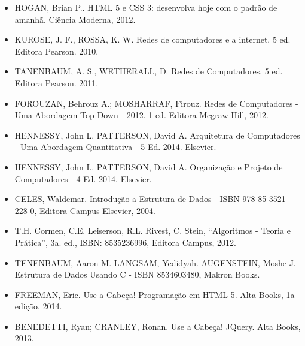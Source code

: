 \begin{itemize}
    \item HOGAN, Brian P..
          HTML 5 e CSS 3: desenvolva hoje com o padrão de amanhã.
          Ciência Moderna, 2012.
	\item KUROSE, J. F., ROSSA, K. W. Redes de computadores e a internet. 5 ed. Editora Pearson. 2010.
	\item TANENBAUM, A. S., WETHERALL, D. Redes de Computadores. 5 ed. Editora Pearson. 2011. 
	\item FOROUZAN, Behrouz A.; MOSHARRAF, Firouz. Redes de Computadores - Uma Abordagem Top-Down - 2012. 1 ed. Editora Mcgraw Hill, 2012.
	\item HENNESSY, John L. PATTERSON, David A. Arquitetura de Computadores - Uma Abordagem Quantitativa - 5 Ed. 2014. Elsevier.
	\item HENNESSY, John L. PATTERSON, David A. Organização e Projeto de Computadores - 4 Ed. 2014. Elsevier.
	\item CELES, Waldemar. Introdução a Estrutura de Dados -  ISBN 978-85-3521-228-0, Editora Campus Elsevier, 2004.
	\item T.H. Cormen, C.E. Leiserson, R.L. Rivest, C. Stein, ``Algoritmos - Teoria e Prática'', 3a. ed., ISBN: 8535236996, Editora Campus, 2012.
	\item TENENBAUM, Aaron M. LANGSAM, Yedidyah. AUGENSTEIN, Moshe J. Estrutura de Dados Usando C - ISBN 8534603480, Makron Books.
    \item FREEMAN, Eric.
          Use a Cabeça! Programação em HTML 5.
          Alta Books, 1a edição, 2014.

    \item BENEDETTI, Ryan; CRANLEY, Ronan.
          Use a Cabeça! JQuery.
          Alta Books, 2013.


\end{itemize}
